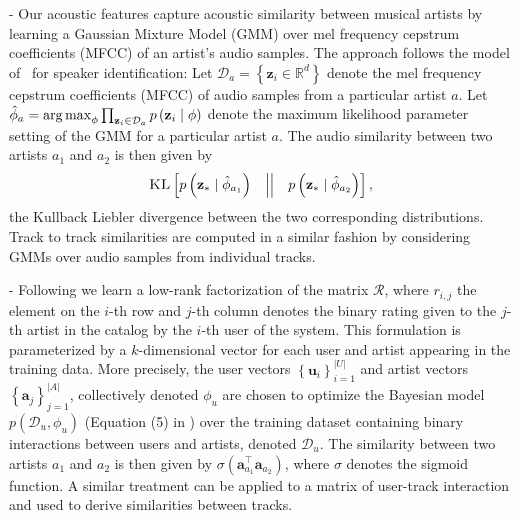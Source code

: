  -
Our acoustic features capture acoustic similarity between musical artists by learning a Gaussian Mixture Model (GMM) over mel frequency cepstrum coefficients (MFCC) of an artist's audio samples. The approach follows the model of~\cite{ReynoldsQD00} for speaker identification: 
Let $\mathcal{D}_a=\left\{\mathbf{z}_i \in \mathbb{R}^d\right\}$ denote the mel frequency cepstrum coefficients (MFCC) of audio samples from a particular artist $a$. 
Let $\hat{\phi}_a=\argmax_{\phi} \prod_{\mathbf{z}_i\in\mathcal{D}_a} p\left(\mathbf{z}_i\mid\phi\right)$ denote the maximum likelihood parameter setting of the GMM for a particular artist $a$. The audio similarity between two artists $a_1$ and $a_2$ is then given by \begin{equation}\textsc{KL}\left[ p\left(\mathbf{z_*}\mid\hat{\phi}_{a_1}\right) \quad \middle| \middle| \quad  p\left(\mathbf{z_*} \mid \hat{\phi}_{a_2}\right)\right
],\end{equation} the Kullback Liebler divergence between the two corresponding distributions.
Track to track similarities are computed in a similar fashion by considering GMMs over audio samples from individual tracks.  

 -
Following \cite{xbox-www} we learn a low-rank factorization of the matrix $\mathcal{R}$,
 where $r_{i,j}$ the element on the $i$-th row and $j$-th column denotes the binary rating given to the $j$-th artist in the catalog by the $i$-th user of the system. This formulation is parameterized by a $k$-dimensional vector for each user and artist appearing in the training data. More precisely, the user vectors $\left\{\mathbf{u}_i\right\}_{i=1}^{|U|}$ and artist vectors $\left\{\mathbf{a}_j\right\}_{j=1}^{|A|}$, collectively denoted $\phi_u$ are chosen to optimize the Bayesian model $p(\mathcal{D}_u,\phi_u)$ (Equation (5) in \cite{xbox-www}) over the training dataset containing binary interactions between users and artists, denoted $\mathcal{D}_u$.  The similarity between two artists $a_1$ and $a_2$ is then given by $\sigma \left(\mathbf{a}_{a_1}^\top\mathbf{a}_{a_2}\right)$, where $\sigma$ denotes the sigmoid function. A similar treatment can be applied to a matrix of user-track interaction and used to derive similarities between tracks.

